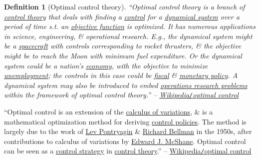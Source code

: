 \documentclass{article}
\newtheorem{definition}{Definition}
\begin{document}
\begin{definition}[Optimal control theory]
	``\emph{Optimal control theory} is a branch of \href{https://en.wikipedia.org/wiki/Control_theory}{control theory} that deals with finding a \href{https://en.wikipedia.org/wiki/Control_(optimal_control_theory)}{control} for a \href{https://en.wikipedia.org/wiki/Dynamical_system}{dynamical system} over a period of time s.t. an \href{https://en.wikipedia.org/wiki/Objective_function}{objective function} is optimized. It has numerous applications in science, engineering, \& operational research. E.g., the dynamical system might be a \href{https://en.wikipedia.org/wiki/Spacecraft}{spacecraft} with controls corresponding to rocket thrusters, \& the objective might be to reach the Moon with minimum fuel expenditure. Or the dynamical system could be a nation's \href{https://en.wikipedia.org/wiki/Economy}{economy}, with the objective to minimize \href{https://en.wikipedia.org/wiki/Unemployment}{unemployment}; the controls in this case could be \href{https://en.wikipedia.org/wiki/Fiscal_policy}{fiscal} \& \href{https://en.wikipedia.org/wiki/Monetary_policy}{monetary policy}. A dynamical system may also be introduced to embed \href{https://en.wikipedia.org/wiki/Operations_research}{operations research problems} within the framework of optimal control theory.'' -- \href{https://en.wikipedia.org/wiki/Optimal_control}{Wikipedia{\tt/}optimal control}
\end{definition}
``Optimal control is an extension of the \href{https://en.wikipedia.org/wiki/Calculus_of_variations}{calculus of variations}, \& is a mathematical optimization method for deriving \href{https://en.wikipedia.org/wiki/Control_theory}{control policies}. The method is largely due to the work of \href{https://en.wikipedia.org/wiki/Lev_Pontryagin}{Lev Pontryagin} \& \href{https://en.wikipedia.org/wiki/Richard_Bellman}{Richard Bellman} in the 1950s, after contributions to calculus of variations by \href{https://en.wikipedia.org/wiki/Edward_J._McShane}{Edward J. McShane}. Optimal control can be seen as a \href{https://en.wikipedia.org/wiki/Control_strategy}{control strategy} in \href{https://en.wikipedia.org/wiki/Control_theory}{control theory}.'' -- \href{https://en.wikipedia.org/wiki/Optimal_control}{Wikipedia{\tt/}optimal control}
\end{document}
